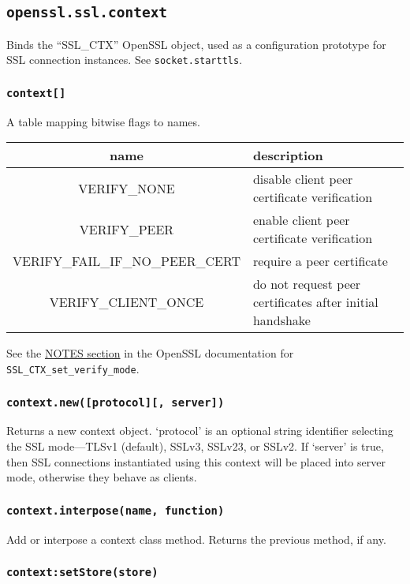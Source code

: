 \documentclass[11pt, oneside]{memoir}
\newcommand*{\fn}[1]{\texttt{#1}\xspace}
\newcommand*{\method}[1]{\texttt{#1}\xspace}
\newcounter{toccols}
\newenvironment{Module}[1]{
	\subsection{\texttt{#1}}
	\addtocontents{toc}{
		\protect\begin{multicols}{\value{toccols}}
	}
}{
	\addtocontents{toc}{\protect\end{multicols}}
}
\begin{document}
\begin{Module}{openssl.ssl.context}

Binds the ``SSL\_CTX'' OpenSSL object, used as a configuration prototype for SSL connection instances. See \method{socket.starttls}.

\subsubsection[\fn{context[]}]{\fn{context[]}}

A table mapping bitwise flags to names.

\begin{tabular}{ c | l }
name & description \\\hline
VERIFY\_NONE & disable client peer certificate verification \\
VERIFY\_PEER & enable client peer certificate verification \\
VERIFY\_FAIL\_IF\_NO\_PEER\_CERT & require a peer certificate \\
VERIFY\_CLIENT\_ONCE & do not request peer certificates after initial handshake
\end{tabular}

See the \href{http://www.openssl.org/docs/ssl/SSL_CTX_set_verify.html#NOTES}{NOTES section} in the OpenSSL documentation for \fn{SSL\_CTX\_set\_verify\_mode}.

\subsubsection[\fn{context.new}]{\fn{context.new([protocol][, server])}}

Returns a new context object. `protocol' is an optional string identifier selecting the SSL mode---TLSv1 (default), SSLv3, SSLv23, or SSLv2. If `server' is true, then SSL connections instantiated using this context will be placed into server mode, otherwise they behave as clients.

\subsubsection[\fn{context.interpose}]{\fn{context.interpose(name, function)}}

Add or interpose a context class method. Returns the previous method, if any.

\subsubsection[\fn{context:setStore}]{\fn{context:setStore(store)}}


\end{Module}
\end{document}
